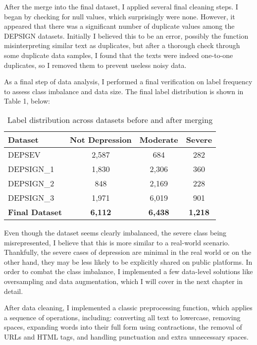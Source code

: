 After the merge into the final dataset, I applied several final cleaning steps. I began by checking for null values, which surprisingly were none. However, it appeared that there was a significant number of duplicate values among the DEPSIGN datasets. Initially I believed this to be an error, possibly the function misinterpreting similar text as duplicates, but after a thorough check through some duplicate data samples, I found that the texts were indeed one-to-one duplicates, so I removed them to prevent useless noisy data.

As a final step of data analysis, I performed a final verification on label frequency to assess class imbalance and data size. The final label distribution is shown in Table 1, below:

\begin{table}
    \centering
    \caption{Label distribution across datasets before and after merging}
    \begin{tabular}{lccc}
        \toprule
            \textbf{Dataset}        & 
            \textbf{Not Depression} & 
            \textbf{Moderate}       & 
            \textbf{Severe}         \\
        \midrule
            DEPSEV        & 2,587  & 684   & 282  \\
            DEPSIGN\_1    & 1,830  & 2,306 & 360  \\
            DEPSIGN\_2    & 848    & 2,169 & 228  \\
            DEPSIGN\_3    & 1,971  & 6,019 & 901  \\
        \midrule
            \textbf{Final Dataset} & 
            \textbf{6,112}         & 
            \textbf{6,438}         & 
            \textbf{1,218}         \\
        \bottomrule
    \end{tabular}
    \label{Table_1}
\end{table}

Even though the dataset seems clearly imbalanced, the severe class being misrepresented, I believe that this is more similar to a real-world scenario. Thankfully, the severe cases of depression are minimal in the real world or on the other hand, they may be less likely to be explicitly shared on public platforms. In order to combat the class imbalance, I implemented a few data-level solutions like oversampling and data augmentation, which I will cover in the next chapter in detail.

After data cleaning, I implemented a classic preprocessing function, which applies a sequence of operations, including: converting all text to lowercase, removing spaces, expanding words into their full form using contractions, the removal of URLs and HTML tags, and handling punctuation and extra unnecessary spaces.

